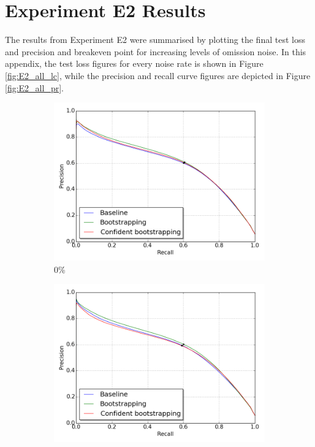 \pagebreak
\section{Experiment E2 Results}
\label{app:fullE5results}
The results from Experiment E2 were summarised by plotting the final test loss and precision and breakeven point for increasing levels of omission noise. In this appendix, the test loss figures for every noise rate is shown in Figure \ref{fig:E2_all_lc}, while the precision and recall curve figures are depicted in Figure \ref{fig:E2_all_pr}.
\begin{figure}[H]
\begin{subfigure}{0.31\textwidth}
\includegraphics[width=\textwidth]{figs/E2/pr_0.png}
\caption{ 0\% } \label{fig:app_E2_0_pr}
\vspace{-0.1cm} %
\end{subfigure}
\hspace*{\fill} %
\begin{subfigure}{0.31\textwidth}
\includegraphics[width=\textwidth]{figs/E2/pr_1.png}

\end{subfigure}
\end{figure}

